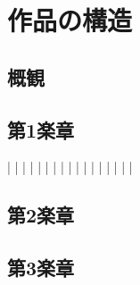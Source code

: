 
\chapter{作品の構造}

\section{概観}

\section{第1楽章}

\musicbegin
	\systemnumbers
	\def\writebarno{\llap{\the\barno\barnoadd}}%
	\def\raisebarno{2\internote}%
	\def\shiftbarno{1.3\Interligne}%
	\def\nbinstruments{1}%
	\startextract%
		\notes{}\ds\ds|\ds\ds{}\enotes
		\Notes{}|\enotes
		\notes|\enotes
		\bar
		\NOTes{}|\enotes
		\Notes{}|\enotes
		\Notes|\enotes
		\bar
		\Notes{}|\ds\enotes
		\Notes{}|\enotes
		\bar
		\notes{}\ds|\enotes
		\notes\ds|\enotes
		\Notes\qp|\enotes
		\notes{}|\enotes
		\bar
		\notes{}\ds|\ds\enotes
	\zendextract %



\section{第2楽章}

\section{第3楽章}

